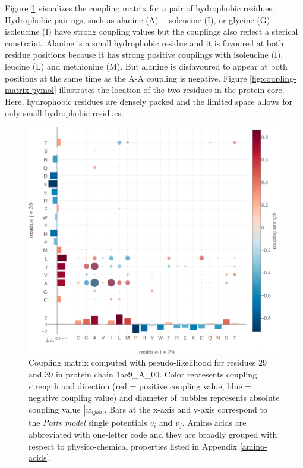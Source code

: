 \documentclass[12pt,a4paper,twoside]{book}
\newcommand{\vi}{v_{i}}
\newcommand{\vj}{v_{j}}
\newcommand{\wijab}{w_{ijab}}
\theoremstyle{definition}
\theoremstyle{definition}
\theoremstyle{remark}
\begin{document}
Figure \ref{fig:coupling-matrix-hydrophobic-interaction} visualizes the
coupling matrix for a pair of hydrophobic residues. Hydrophobic
pairings, such as alanine (A) - isoleucine (I), or glycine (G) -
isoleucine (I) have strong coupling values but the couplings also
reflect a sterical constraint. Alanine is a small hydrophobic residue
and it is favoured at both residue positions because it has strong
positive couplings with isoleucine (I), leucine (L) and methionine (M).
But alanine is disfavoured to appear at both positions at the same time
as the A-A coupling is negative. Figure \ref{fig:coupling-matrix-pymol}
illustrates the location of the two residues in the protein core. Here,
hydrophobic residues are densely packed and the limited space allows for
only small hydrophobic residues.











\begin{figure}
\includegraphics[width=0.9\linewidth]{img/coupling_matrix_analysis/coupling_matrix_1ae9A00_29_39_notitle} \caption{Coupling matrix
computed with pseudo-likelihood for residues 29 and 39 in protein chain
1ae9\_A\_00. Color represents coupling strength and direction (red =
positive coupling value, blue = negative coupling value) and diameter of
bubbles represents absolute coupling value \(|\wijab|\). Bars at the
x-axis and y-axis correspond to the \emph{Potts model} single potentials
\(\vi\) and \(\vj\). Amino acids are abbreviated with one-letter code
and they are broadly grouped with respect to physico-chemical properties
listed in Appendix \ref{amino-acids}.}\label{fig:coupling-matrix-hydrophobic-interaction}
\end{figure}
\end{document}
